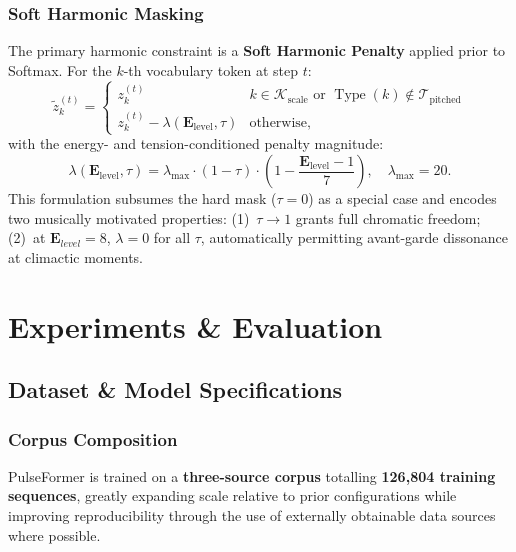 \documentclass[pdflatex,sn-mathphys-num,twocolumn]{sn-jnl}
\theoremstyle{thmstyleone}
\theoremstyle{thmstyletwo}
\begin{document}
\subsubsection*{Soft Harmonic Masking}
\label{sec:soft_mask}
The primary harmonic constraint is a \textbf{Soft Harmonic Penalty} applied prior to Softmax. For the $k$-th vocabulary token at step $t$:
\begin{equation}
\tilde{z}_k^{(t)} =
\begin{cases}
z_k^{(t)} & k\in\mathcal{K}_{\text{scale}}\text{ or }\operatorname{Type}(k)\notin\mathcal{T}_{\text{pitched}} \\[3pt]
z_k^{(t)} - \lambda(\mathbf{E}_{\text{level}},\tau) & \text{otherwise,}
\end{cases}
\end{equation}
with the energy- and tension-conditioned penalty magnitude:
\begin{equation}
\lambda(\mathbf{E}_{\text{level}},\tau) =
  \lambda_{\max}\cdot(1-\tau)\cdot
  \left(1-\frac{\mathbf{E}_{\text{level}}-1}{7}\right), \quad \lambda_{\max}=20.
\end{equation}
This formulation subsumes the hard mask ($\tau=0$) as a special case and encodes two musically motivated properties: (1)~$\tau\to 1$ grants full chromatic freedom; (2)~at $\mathbf{E}_{level}=8$, $\lambda=0$ for all $\tau$, automatically permitting avant-garde dissonance at climactic moments.

\section{Experiments \& Evaluation}

\subsection{Dataset \& Model Specifications}
\label{sec:dataset}

\subsubsection*{Corpus Composition}

PulseFormer is trained on a \textbf{three-source corpus} totalling
\textbf{126,804 training sequences}, greatly expanding scale relative to
prior configurations while improving reproducibility through the use of
externally obtainable data sources where possible.
\end{document}
